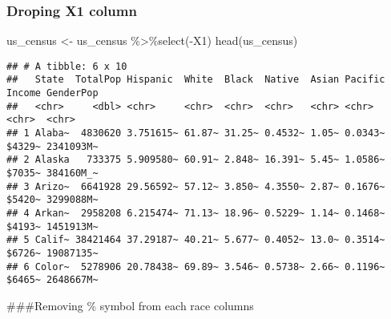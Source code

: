 \documentclass[
]{article}
\newenvironment{Shaded}{\begin{snugshade}}{\end{snugshade}}
\newcommand{\FunctionTok}[1]{\textcolor[rgb]{0.00,0.00,0.00}{#1}}
\newcommand{\NormalTok}[1]{#1}
\newcommand{\OtherTok}[1]{\textcolor[rgb]{0.56,0.35,0.01}{#1}}
\newcommand{\SpecialCharTok}[1]{\textcolor[rgb]{0.00,0.00,0.00}{#1}}
\begin{document}
\hypertarget{droping-x1-column}{%
\subsubsection{Droping X1 column}\label{droping-x1-column}}

\begin{Shaded}
\begin{Highlighting}[]
\NormalTok{us\_census }\OtherTok{\textless{}{-}}\NormalTok{ us\_census }\SpecialCharTok{\%\textgreater{}\%}\FunctionTok{select}\NormalTok{(}\SpecialCharTok{{-}}\NormalTok{X1)}
\FunctionTok{head}\NormalTok{(us\_census)}
\end{Highlighting}
\end{Shaded}

\begin{verbatim}
## # A tibble: 6 x 10
##   State  TotalPop Hispanic  White  Black  Native  Asian Pacific Income GenderPop
##   <chr>     <dbl> <chr>     <chr>  <chr>  <chr>   <chr> <chr>   <chr>  <chr>    
## 1 Alaba~  4830620 3.751615~ 61.87~ 31.25~ 0.4532~ 1.05~ 0.0343~ $4329~ 2341093M~
## 2 Alaska   733375 5.909580~ 60.91~ 2.848~ 16.391~ 5.45~ 1.0586~ $7035~ 384160M_~
## 3 Arizo~  6641928 29.56592~ 57.12~ 3.850~ 4.3550~ 2.87~ 0.1676~ $5420~ 3299088M~
## 4 Arkan~  2958208 6.215474~ 71.13~ 18.96~ 0.5229~ 1.14~ 0.1468~ $4193~ 1451913M~
## 5 Calif~ 38421464 37.29187~ 40.21~ 5.677~ 0.4052~ 13.0~ 0.3514~ $6726~ 19087135~
## 6 Color~  5278906 20.78438~ 69.89~ 3.546~ 0.5738~ 2.66~ 0.1196~ $6465~ 2648667M~
\end{verbatim}

\#\#\#Removing \(\%\) symbol from each race columns
\end{document}

